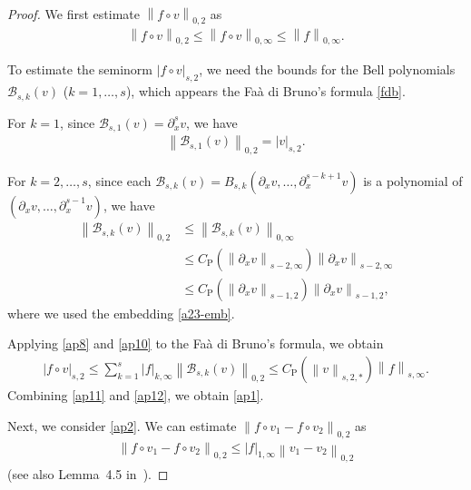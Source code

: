 \documentclass[10pt,a4paper,tbtags,leqno]{amsart}
\theoremstyle{definition}
\numberwithin{equation}{section}
\def\norm#1#2{\left\|#2\right\|_{#1}}
\def\snorm#1#2{\left|#2\right|_{#1}}
\begin{document}
\begin{proof}
  We first estimate $ \norm{0, 2}{f \circ v} $ as 
  \begin{align}
    \norm{0, 2}{f \circ v} \leq \norm{0, \infty}{f \circ v} \leq \norm{0, \infty}{f}. \label{ap11}
  \end{align}

  To estimate the seminorm $ \snorm{s, 2}{f \circ v} $, we need the bounds for the Bell polynomials $ \mathcal{B}_{s, k} (v) $ ($ k = 1, \ldots, s $), which appears the Fa\`a di Bruno's formula \eqref{fdb}. 
  
  For $ k = 1 $, since $ \mathcal{B}_{s, 1} (v) = \partial_x^s v $, we have 
  \begin{align}
    \norm{0, 2}{\mathcal{B}_{s, 1} (v)} = \snorm{s, 2}{v}. \label{ap8}
  \end{align} 
  
  For $ k = 2, \ldots, s $, since each $ \mathcal{B}_{s, k} (v) = B_{s, k} (\partial_x v, \ldots, \partial_x^{s - k + 1} v) $ is a polynomial of $ (\partial_x v, \ldots, \partial_x^{s - 1} v) $, we have 
  \begin{align} 
    \norm{0, 2}{\mathcal{B}_{s, k} (v)} & \leq \norm{0, \infty}{\mathcal{B}_{s, k} (v)} \\ & \leq C_{\mathrm{P}} (\norm{s - 2, \infty}{\partial_x v}) \norm{s - 2, \infty}{\partial_x v} \\ & \leq C_{\mathrm{P}} (\norm{s - 1, 2}{\partial_x v}) \norm{s - 1, 2}{\partial_x v}, \label{ap10} 
  \end{align} 
  where we used the embedding \eqref{a23-emb}. 
  
  Applying \eqref{ap8} and \eqref{ap10} to the Fa\`a di Bruno's formula, we obtain 
  \begin{align} 
    \snorm{s, 2}{f \circ v} \leq \sum_{k=1}^{s} \snorm{k, \infty}{f} \norm{0, 2}{\mathcal{B}_{s, k} (v)} \leq C_{\mathrm{P}} (\norm{s, 2, \ast}{v}) \norm{s, \infty}{f}. \label{ap12} 
  \end{align} 
  Combining \eqref{ap11} and \eqref{ap12}, we obtain \eqref{ap1}. 

  Next, we consider \eqref{ap2}. We can estimate $ \norm{0, 2}{f \circ v_1 - f \circ v_2} $ as 
  \begin{align}
    \norm{0, 2}{f \circ v_1 - f \circ v_2} \leq \snorm{1, \infty}{f} \norm{0, 2}{v_1 - v_2} \label{ap3}
  \end{align} 
  (see also Lemma~4.5 in~\cite{00AcGu}). %


\end{proof}
\end{document}

